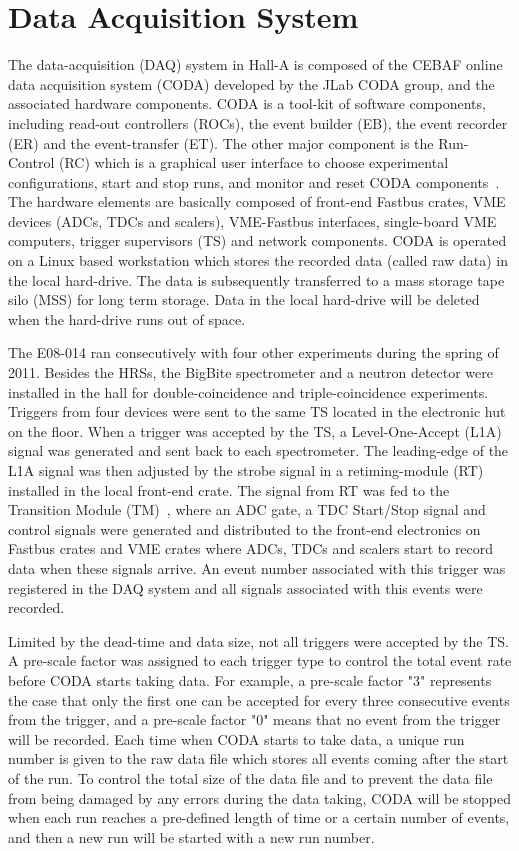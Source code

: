 \section{Data Acquisition System}
 The data-acquisition (DAQ) system in Hall-A is composed of the CEBAF online data acquisition system (CODA) developed by the JLab CODA group, and the associated hardware components. CODA is a tool-kit of software components, including read-out controllers (ROCs), the event builder (EB), the event recorder (ER) and the event-transfer (ET). The other major component is the Run-Control (RC) which is a graphical user interface to choose experimental configurations, start and stop runs, and monitor and reset CODA components~\cite{halla_nim}. The hardware elements are basically composed of front-end Fastbus crates, VME devices (ADCs, TDCs and scalers), VME-Fastbus interfaces, single-board VME computers, trigger supervisors (TS) and network components. CODA is operated on a Linux based workstation which stores the recorded data (called raw data) in the local hard-drive. The data is subsequently transferred to a mass storage tape silo (MSS) for long term storage. Data in the local hard-drive will be deleted when the hard-drive runs out of space. 
 
  The E08-014 ran consecutively with four other experiments during the spring of 2011. Besides the HRSs, the BigBite spectrometer and a neutron detector were installed in the hall for double-coincidence and triple-coincidence experiments. Triggers from four devices were sent to the same TS located in the electronic hut on the floor. When a trigger was accepted by the TS, a Level-One-Accept (L1A) signal was generated and sent back to each spectrometer. The leading-edge of the L1A signal was then adjusted by the strobe signal in a retiming-module (RT) installed in the local front-end crate. The signal from RT was fed to the Transition Module (TM)~\cite{ts_tm}, where an ADC gate, a TDC Start/Stop signal and control signals were generated and distributed to the front-end electronics on Fastbus crates and VME crates where ADCs, TDCs and scalers start to record data when these signals arrive. An event number associated with this trigger was registered in the DAQ system and all signals associated with this events were recorded.
  
   Limited by the dead-time and data size, not all triggers were accepted by the TS. A pre-scale factor was assigned to each trigger type to control the total event rate before CODA starts taking data. For example, a pre-scale factor "3" represents the case that only the first one can be accepted for every three consecutive events from the trigger, and a pre-scale factor "0" means that no event from the trigger will be recorded. Each time when CODA starts to take data, a unique run number is given to the raw data file which stores all events coming after the start of the run. To control the total size of the data file and to prevent the data file from being damaged by any errors during the data taking, CODA will be stopped when each run reaches a pre-defined length of time or a certain number of events, and then a new run will be started with a new run number. 

